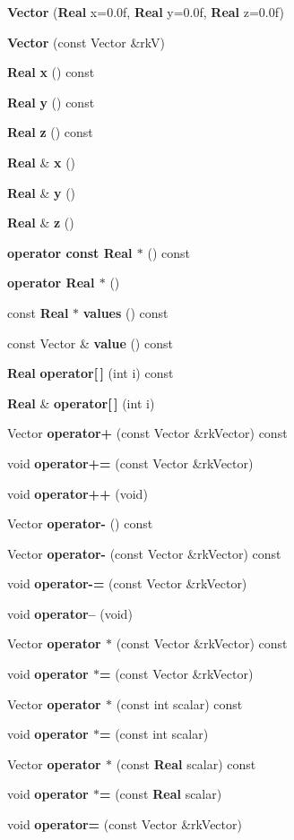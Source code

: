\begin{CompactItemize}
\item 
{\bf Vector} ({\bf Real} x=0.0f, {\bf Real} y=0.0f, {\bf Real} z=0.0f)
\item 
{\bf Vector} (const Vector \&rk\-V)
\item 
{\bf Real} {\bf x} () const
\item 
{\bf Real} {\bf y} () const
\item 
{\bf Real} {\bf z} () const
\item 
{\bf Real} \& {\bf x} ()
\item 
{\bf Real} \& {\bf y} ()
\item 
{\bf Real} \& {\bf z} ()
\item 
{\bf operator const Real $\ast$} () const
\item 
{\bf operator Real $\ast$} ()
\item 
const {\bf Real} $\ast$ {\bf values} () const
\item 
const Vector \& {\bf value} () const
\item 
{\bf Real} {\bf operator[$\,$]} (int i) const
\item 
{\bf Real} \& {\bf operator[$\,$]} (int i)
\item 
Vector {\bf operator+} (const Vector \&rk\-Vector) const
\item 
void {\bf operator+=} (const Vector \&rk\-Vector)
\item 
void {\bf operator++} (void)
\item 
Vector {\bf operator-} () const
\item 
Vector {\bf operator-} (const Vector \&rk\-Vector) const
\item 
void {\bf operator-=} (const Vector \&rk\-Vector)
\item 
void {\bf operator--} (void)
\item 
Vector {\bf operator $\ast$} (const Vector \&rk\-Vector) const
\item 
void {\bf operator $\ast$=} (const Vector \&rk\-Vector)
\item 
Vector {\bf operator $\ast$} (const int scalar) const
\item 
void {\bf operator $\ast$=} (const int scalar)
\item 
Vector {\bf operator $\ast$} (const {\bf Real} scalar) const
\item 
void {\bf operator $\ast$=} (const {\bf Real} scalar)
\item 
void {\bf operator=} (const Vector \&rk\-Vector)
\item 

\end{CompactItemize}
